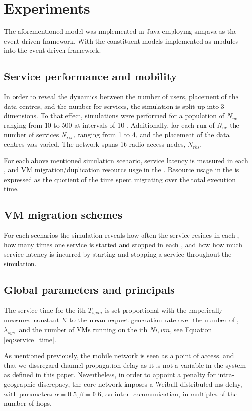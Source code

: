 \section{Experiments}
The aforementioned model was implemented in Java employing simjava \cite{SimJava} as the event driven framework. With the constituent models implemented as modules into the event driven framework.

\subsection{Service performance and mobility}

In order to reveal the dynamics between the number of users, placement of the data centres, and the number for services, the simulation is split up into 3 dimensions. To that effect, simulations were performed for a population of \ues{} $N_{ue}$ ranging from 10 to 500 \ues{} at intervals of 10 \ues{}. Additionally, for each run of $N_{ue}$ the number of services $N_{ser}$, ranging from 1 to 4, and the placement of the data centres was varied. The network spans 16 radio access nodes, $N_{rbs}$.

For each above mentioned simulation scenario, service latency is measured in each \ue{}, and VM migration/duplication resource usge in the \dc{}. Resource usage in the \dcs{} is expressed as the quotient of the time spent migrating over the total execution time.

\subsection{VM migration schemes}
For each scenarios the simulation reveals how often the service resides in each \dc{}, how many times one service is started and stopped in each \dc{}, and how how much service latency is incurred by starting and stopping a service throughout the simulation.

\subsection{Global parameters and principals}
The \dc{} service time for the ith \dc{} $T_{i,vm}$ is set proportional with the emperically measured constant $K$ to the mean request generation rate over the number of \rbss{}, $\bar{\lambda}_{sys}$, and the number of VMs running on the ith \dc{} $N{i,vm}$, see Equation \ref{eq:service_time}.

As mentioned previously, the mobile network is seen as a point of access, and that we dissregard channel propagation delay as it is not a variable in the \xcloud system as defined in this paper. Nevertheless, in order to appoint a penalty for intra-\dc{} geographic discrepacy, the core network imposes a Weibull distributed ms delay, with parameters $\alpha=0.5, \beta=0.6$, on intra-\dc{} communication, in multiples of the number of hops.

